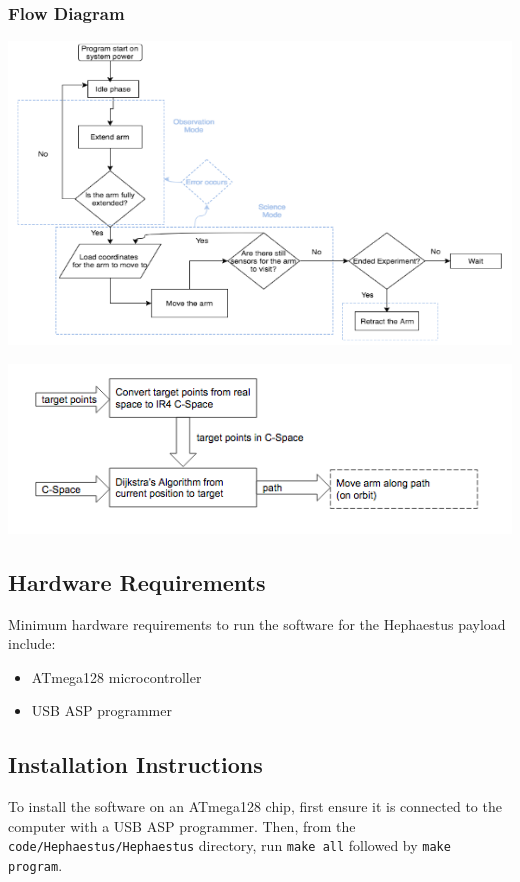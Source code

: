 \subsubsection{Flow Diagram}
\includegraphics[width=\textwidth]{./images/ProjectDocs/flowDiagram}

\includegraphics[width=\textwidth]{./images/ProjectDocs/pathingAndAutomationFlow}

\subsection{Hardware Requirements}
Minimum hardware requirements to run the software for the Hephaestus payload include:
\begin{itemize}
	\item{ATmega128 microcontroller}
	\item{USB ASP programmer}
\end{itemize}

\subsection{Installation Instructions}
To install the software on an ATmega128 chip, first ensure it is connected to
the computer with a USB ASP programmer. Then, from the 
\texttt{code/Hephaestus/Hephaestus} directory, run \texttt{make all}
followed by \texttt{make program}.


